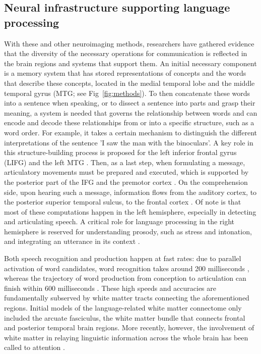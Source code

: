 \subsection{Neural infrastructure supporting language processing} 

With these and other neuroimaging methods, researchers have gathered evidence that the diversity of the necessary operations for communication is reflected in the brain regions and systems that support them. An initial necessary component is a memory system that has stored representations of concepts and the words that describe these concepts, located in the medial temporal lobe and the middle temporal gyrus (MTG; see Fig~\ref{fig:methods}). To then concatenate these words into a sentence when speaking, or to dissect a sentence into parts and grasp their meaning, a system is needed that governs the relationship between words and can encode and decode these relationships from or into a specific structure, such as a word order. For example, it takes a certain mechanism to distinguish the different interpretations of the sentence 'I saw the man with the binoculars'. A key role in this structure-building process is proposed for the left inferior frontal gyrus (LIFG) and the left MTG \citep{giglio2022,hagoort2017}. Then, as a last step, when formulating a message, articulatory movements must be prepared and executed, which is supported by the posterior part of the IFG and the premotor cortex \citep[PM; ][]{hickok2007}. On the comprehension side, upon hearing such a message, information flows from the auditory cortex, to the posterior superior temporal sulcus, to the frontal cortex \citep{friederici2012}. Of note is that most of these computations happen in the left hemisphere, especially in detecting and articulating speech. A critical role for language processing in the right hemisphere is reserved for understanding prosody, such as stress and intonation, and integrating an utterance in its context \citep{beaucousin2006,vigneau2011}.


Both speech recognition and production happen at fast rates: due to parallel activation of word candidates, word recognition takes around 200 milliseconds \citep{mcclelland1986}, whereas the trajectory of word production from conception to articulation can finish within 600 milliseconds \citep{indefrey2004}. These high speeds and accuracies are fundamentally subserved by white matter tracts connecting the aforementioned regions. Initial models of the language-related white matter connectome only included the arcuate fasciculus, the white matter bundle that connects frontal and posterior temporal brain regions. More recently, however, the involvement of white matter in relaying linguistic information across the whole brain has been called to attention \citep{przezdzik2019,tyler2007}.  


